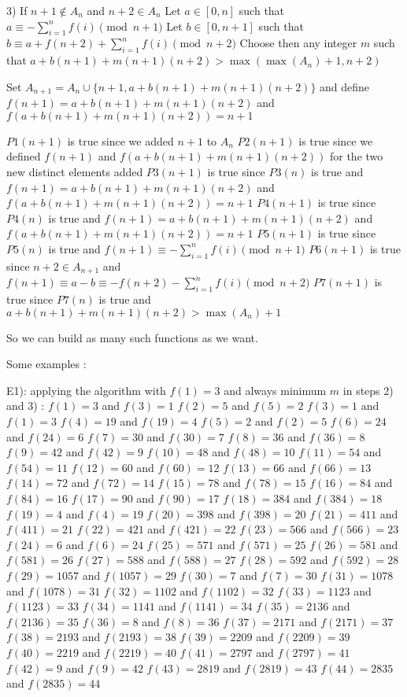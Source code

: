 \begin{solution}
3) If $n+1\notin A_n$ and $n+2\in A_n$
Let $a\in[0,n]$ such that $a\equiv -\sum_{i=1}^nf(i)\pmod{n+1}$
Let $b\in[0,n+1]$ such that $b\equiv a+f(n+2)+\sum_{i=1}^nf(i)\pmod{n+2}$
Choose then any integer $m$ such that $a+b(n+1)+m(n+1)(n+2)>\max(\max(A_n)+1,n+2)$

Set $A_{n+1}=A_n\cup\{n+1,a+b(n+1)+m(n+1)(n+2)\}$ and define $f(n+1)=a+b(n+1)+m(n+1)(n+2)$ and $f(a+b(n+1)+m(n+1)(n+2))=n+1$

$P1(n+1)$ is true since we added $n+1$ to $A_n$
$P2(n+1)$ is true since we defined $f(n+1)$ and $f(a+b(n+1)+m(n+1)(n+2))$ for the two new distinct elements added
$P3(n+1)$ is true since $P3(n)$ is true and $f(n+1)=a+b(n+1)+m(n+1)(n+2)$ and $f(a+b(n+1)+m(n+1)(n+2))=n+1$
$P4(n+1)$ is true since $P4(n)$ is true and $f(n+1)=a+b(n+1)+m(n+1)(n+2)$ and $f(a+b(n+1)+m(n+1)(n+2))=n+1$
$P5(n+1)$ is true since $P5(n)$ is true and $f(n+1)\equiv -\sum_{i=1}^nf(i)\pmod{n+1}$
$P6(n+1)$ is true since $n+2\in A_{n+1}$ and $f(n+1)\equiv a-b\equiv -f(n+2)-\sum_{i=1}^nf(i)\pmod{n+2}$
$P7(n+1)$ is true since $P7(n)$ is true and $a+b(n+1)+m(n+1)(n+2)>\max(A_n)+1$

So we can build as many such functions as we want.

Some examples :

E1): applying the algorithm with $f(1)=3$ and always minimum $m$ in steps 2) and 3) :
$f(1)=3$ and $f(3)=1$
$f(2)=5$ and $f(5)=2$
$f(3)=1$ and $f(1)=3$
$f(4)=19$ and $f(19)=4$
$f(5)=2$ and $f(2)=5$
$f(6)=24$ and $f(24)=6$
$f(7)=30$ and $f(30)=7$
$f(8)=36$ and $f(36)=8$
$f(9)=42$ and $f(42)=9$
$f(10)=48$ and $f(48)=10$
$f(11)=54$ and $f(54)=11$
$f(12)=60$ and $f(60)=12$
$f(13)=66$ and $f(66)=13$
$f(14)=72$ and $f(72)=14$
$f(15)=78$ and $f(78)=15$
$f(16)=84$ and $f(84)=16$
$f(17)=90$ and $f(90)=17$
$f(18)=384$ and $f(384)=18$
$f(19)=4$ and $f(4)=19$
$f(20)=398$ and $f(398)=20$
$f(21)=411$ and $f(411)=21$
$f(22)=421$ and $f(421)=22$
$f(23)=566$ and $f(566)=23$
$f(24)=6$ and $f(6)=24$
$f(25)=571$ and $f(571)=25$
$f(26)=581$ and $f(581)=26$
$f(27)=588$ and $f(588)=27$
$f(28)=592$ and $f(592)=28$
$f(29)=1057$ and $f(1057)=29$
$f(30)=7$ and $f(7)=30$
$f(31)=1078$ and $f(1078)=31$
$f(32)=1102$ and $f(1102)=32$
$f(33)=1123$ and $f(1123)=33$
$f(34)=1141$ and $f(1141)=34$
$f(35)=2136$ and $f(2136)=35$
$f(36)=8$ and $f(8)=36$
$f(37)=2171$ and $f(2171)=37$
$f(38)=2193$ and $f(2193)=38$
$f(39)=2209$ and $f(2209)=39$
$f(40)=2219$ and $f(2219)=40$
$f(41)=2797$ and $f(2797)=41$
$f(42)=9$ and $f(9)=42$
$f(43)=2819$ and $f(2819)=43$
$f(44)=2835$ and $f(2835)=44$


\end{solution}
